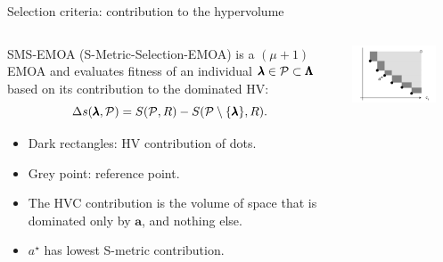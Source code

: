 \begin{frame}[allowframebreaks]{Selection criteria: contribution to the hypervolume}

\begin{columns}
\begin{column}{0.5\textwidth}
SMS-EMOA (S-Metric-Selection-EMOA) is a $(\mu+1)$ EMOA and evaluates fitness of an individual $\pmb{\lambda} \in \mathcal{P} \subset \pmb{\Lambda}$ based on its contribution to the dominated HV:
$$
\Delta s(\pmb{\lambda}, \mathcal{P}) = S(\mathcal{P}, R) - S(\mathcal{P} \setminus \{ \pmb{\lambda}\}, R).
$$

\begin{itemize}
\item Dark rectangles: HV contribution of dots.
\item Grey point: reference point.
\item The HVC contribution is the volume of space that is dominated only by $\bm{a}$, and nothing else.
\item $a^\star$ has lowest S-metric contribution.
\end{itemize}
\end{column}

\begin{column}{0.5\textwidth}
\begin{center}
\includegraphics[width = 0.8\textwidth]{images/hypervolumenbeitrag.png}
\end{center}
\end{column}
\end{columns}


\end{frame}
